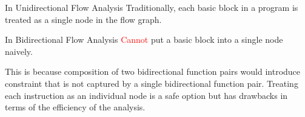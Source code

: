 \documentclass{llncs}
\newcommand{\Pow}{\mathcal{P}}
\newcommand{\tomon}{\to_{\mathrm{mon}}}
\newcommand{\red}[1]{\textcolor{red}{#1}}
\begin{document}
  In Unidirectional Flow Analysis
    Traditionally, each basic block in a program is treated as a single node in the flow graph.
 
  In Bidirectional Flow Analysis
    \red{Cannot} put a basic block into a single node naively.

  This is because composition of two bidirectional function pairs would introduce constraint that is not captured by a single bidirectional function pair. Treating each instruction as an individual node is a safe option but has drawbacks in terms of the efficiency of the analysis.



% 

%
% 
\end{document}

